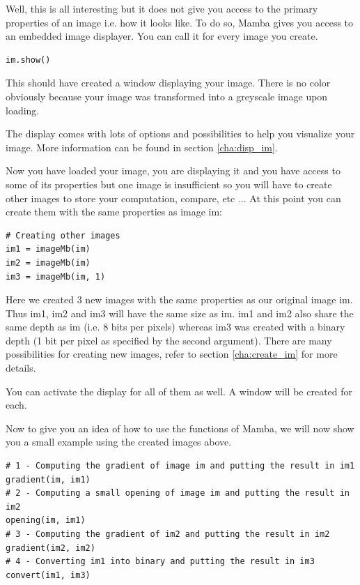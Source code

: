 \documentclass[a4paper,10pt,oneside]{article}
\begin{document}
Well, this is all interesting but it does not give you access to the primary
properties of an image i.e. how it looks like. To do so, Mamba gives you access to
an embedded image displayer. You can call it for every image you create.

\lstset{language=Python}
\begin{lstlisting}
im.show()
\end{lstlisting}

This should have created a window displaying your image. There is no color
obviously because your image was transformed into a greyscale image upon loading.

The display comes with lots of options and possibilities to help you visualize
your image. More information can be found in section \ref{cha:disp_im}.

Now you have loaded your image, you are displaying it and you have access to 
some of its properties but one image is insufficient so you will have to create
other images to store your computation, compare, etc ... At this point you can
create them with the same properties as image im:

\lstset{language=Python}
\begin{lstlisting}
# Creating other images
im1 = imageMb(im)
im2 = imageMb(im)
im3 = imageMb(im, 1)
\end{lstlisting}

Here we created 3 new images with the same properties as our original image im.
Thus im1, im2 and im3 will have the same size as im. im1 and im2 also share 
the same depth as im (i.e. 8 bits per pixels) whereas im3 was created with a 
binary depth (1 bit per pixel as specified by the second argument). There are many
possibilities for creating new images, refer to section \ref{cha:create_im} for
more details.

You can activate the display for all of them as well. A window will be created
for each.

Now to give you an idea of how to use the functions of Mamba, we will now show
you a small example using the created images above.

\lstset{language=Python}
\begin{lstlisting}
# 1 - Computing the gradient of image im and putting the result in im1
gradient(im, im1)
# 2 - Computing a small opening of image im and putting the result in im2
opening(im, im1)
# 3 - Computing the gradient of im2 and putting the result in im2
gradient(im2, im2)
# 4 - Converting im1 into binary and putting the result in im3
convert(im1, im3)
\end{lstlisting}
\end{document}
